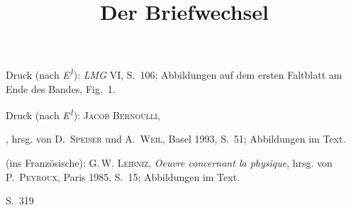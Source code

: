 %
\begin{ledgroupsized}[r]{114mm}
\footnotesize 
\pstart \parindent -6mm
%
Druck (nach \textit{E\textsuperscript{1}}): \textit{LMG} VI,
S.~106; Abbildungen auf dem ersten Faltblatt am Ende des Bandes, Fig.~1.\cite{01043}
\pend
\end{ledgroupsized}
%
\begin{ledgroupsized}[r]{114mm}
\footnotesize 
\pstart
\parindent -6mm
%
Druck (nach \textit{E\textsuperscript{1}}): \textsc{Jacob Bernoulli}, \title{Der Briefwechsel}, hrsg. von D.~\textsc{Speiser} und A.~\textsc{Weil}, Basel 1993, S.~51; Abbildungen im Text.\cite{01044}
\pend
\end{ledgroupsized}
%
%
\begin{ledgroupsized}[r]{114mm}
\footnotesize 
\pstart
\parindent -6mm
%
(ins Französische): G.\,W. \textsc{Leibniz}, \textit{Oeuvre concernant la physique}, hrsg. von P.~\textsc{Peyroux}, Paris 1985, S.~15; Abbildungen im Text.\cite{01248}
\pend
\end{ledgroupsized}
%
%
%
\frenchspacing%
%
%
\count{}
\count{}
\count{}
%
%
%
\newpage%
\pstart%
\normalsize%
\noindent%
\lbrack S.~319\rbrack{}  %
\pend%
\vspace{-0.5em}
%
%
\pstart%
\centering%
%
